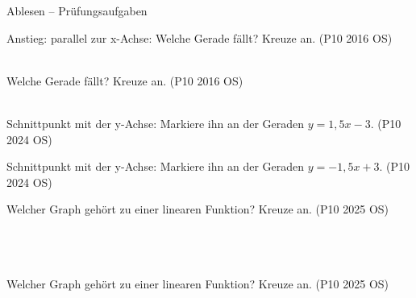 \begin{aufgabe}{Ablesen – Prüfungsaufgaben}
\begin{teile}
\begin{ksys}[xmin=-5,xmax=5,ymin=-5,ymax=5,ablesen]    \end{ksys}
Anstieg: \leerfeld \quad parallel zur x-Achse: \leerfeld
\teil Welche Gerade fällt? Kreuze an. \hfill (P10 2016 OS) \\  \\ 

\begin{ksys}[xmin=-5,xmax=5,ymin=-5,ymax=5,ablesen]   \end{ksys}
\teil Welche Gerade fällt? Kreuze an. \hfill (P10 2016 OS) \\  \\ 

\begin{ksys}[xmin=-5,xmax=5,ymin=-5,ymax=5,ablesen]   \end{ksys}
\teil Schnittpunkt mit der y-Achse: Markiere ihn an der Geraden $y = 1{,}5x - 3$. \hfill (P10 2024 OS)

\begin{ksys}[xmin=-5,xmax=5,ymin=-5,ymax=5,ablesen]  \end{ksys}
\teil Schnittpunkt mit der y-Achse: Markiere ihn an der Geraden $y = -1{,}5x + 3$. \hfill (P10 2024 OS)

\begin{ksys}[xmin=-5,xmax=5,ymin=-5,ymax=5,ablesen]  \end{ksys}
\teil Welcher Graph gehört zu einer linearen Funktion? Kreuze an. \hfill (P10 2025 OS) \\  \\  \\  \\ 

\begin{ksys}[xmin=-5,xmax=5,ymin=-5,ymax=5,ablesen]     \end{ksys}
\teil Welcher Graph gehört zu einer linearen Funktion? Kreuze an. \hfill (P10 2025 OS) \\  \\  \\  \\ 

\begin{ksys}[xmin=-5,xmax=5,ymin=-5,ymax=5,ablesen]     \end{ksys}
\end{teile}
\end{aufgabe}

